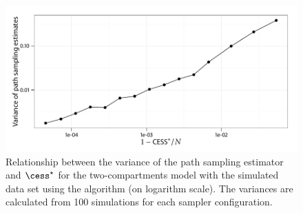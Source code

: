 \begin{figure}[t]
  \UseAltLinespread
  \includegraphics[width=\linewidth]{fig_src/CESS_Path_Var}
  \caption[Relationship between the variance of the path sampling estimator and
  \protect\cess]
  {Relationship between the variance of the path sampling estimator and $\cess^\star$ for the two-compartments \pet model with the simulated data set using the \smc[2] algorithm (on logarithm scale). The variances are calculated from 100 simulations for each sampler configuration.}
  \label{fig:cess path var}
\end{figure}
